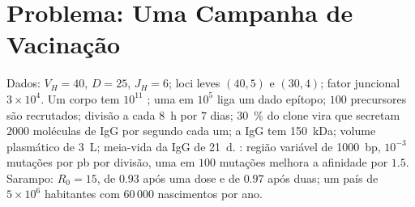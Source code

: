 \section{Problema: Uma Campanha de Vacinação}

\begin{problem}
\label{pb:b3:adaptive-immunity:1}
Dados: $V_{H} = 40$, $D = 25$, $J_{H} = 6$; loci leves $(40, 5)$ e
$(30, 4)$; fator juncional $3\times 10^{4}$. Um corpo tem $10^{11}$
; uma em $10^{5}$ liga um dado epítopo; $100$ precursores são
recrutados; divisão a cada \qty{8}{h} por $7$ dias; \qty{30}{\%} do
clone vira  que secretam $2000$ moléculas de IgG por segundo
cada um; a IgG tem \qty{150}{kDa}; volume plasmático de \qty{3}{L};
meia-vida da IgG de \qty{21}{d}. : região variável de
\qty{1000}{bp}, $10^{-3}$ mutações por pb por divisão, uma em $100$
mutações melhora a afinidade por $1.5$. Sarampo: $R_{0} = 15$,  de $0.93$ após uma dose e de $0.97$ após duas; um país de
$5\times 10^{6}$ habitantes com $60\,000$ nascimentos por ano.


\end{problem}
